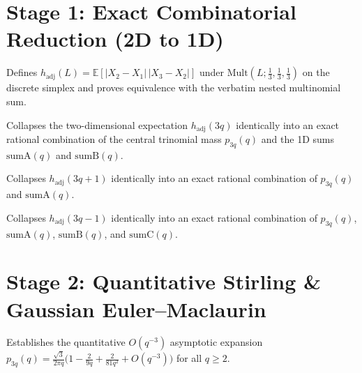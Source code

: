 \section{Stage 1: Exact Combinatorial Reduction (2D to 1D)}

\begin{definition}
\label{def:hadj}
\leanok
Defines $h_{\mathrm{adj}}(L) = \mathbb{E}[|X_2 - X_1|\,|X_3 - X_2|]$ under $\mathrm{Mult}(L; \frac13, \frac13, \frac13)$ on the discrete simplex and proves equivalence with the verbatim nested multinomial sum.
\end{definition}

\begin{theorem}[Exact 1D Reduction for $L = 3q$]
\label{thm:hadj-mod0}
\leanok
Collapses the two-dimensional expectation $h_{\mathrm{adj}}(3q)$ identically into an exact rational combination of the central trinomial mass $p_{3q}(q)$ and the 1D sums $\mathrm{sumA}(q)$ and $\mathrm{sumB}(q)$.
\end{theorem}

\begin{theorem}[Exact 1D Reduction for $L = 3q + 1$]
\label{thm:hadj-mod1}
\leanok
Collapses $h_{\mathrm{adj}}(3q+1)$ identically into an exact rational combination of $p_{3q}(q)$ and $\mathrm{sumA}(q)$.
\end{theorem}

\begin{theorem}[Exact 1D Reduction for $L = 3q - 1$]
\label{thm:hadj-mod2}
\leanok
Collapses $h_{\mathrm{adj}}(3q-1)$ identically into an exact rational combination of $p_{3q}(q)$, $\mathrm{sumA}(q)$, $\mathrm{sumB}(q)$, and $\mathrm{sumC}(q)$.
\end{theorem}

\section{Stage 2: Quantitative Stirling \& Gaussian Euler--Maclaurin}

\begin{theorem}
\label{thm:stirling}
\leanok
Establishes the quantitative $O(q^{-3})$ asymptotic expansion $p_{3q}(q) = \frac{\sqrt{3}}{2\pi q}\bigl(1 - \frac{2}{9q} + \frac{2}{81q^2} + O(q^{-3})\bigr)$ for all $q \ge 2$.
\end{theorem}

